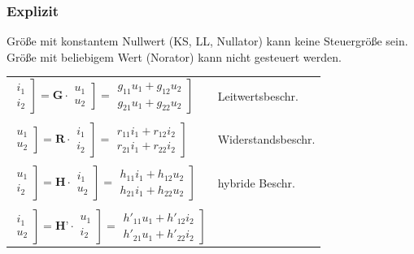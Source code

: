 \documentclass[a4paper,twocolumn,10pt]{article}
\begin{document}
\subsubsection*{Explizit}
Größe mit konstantem Nullwert (KS, LL, Nullator) kann keine Steuergröße sein. Größe mit beliebigem Wert (Norator) kann nicht gesteuert werden.
\begin{tabular}{ll}
	$\left.\begin{matrix}i_1\\i_2\end{matrix}\right] =\textbf{G}\cdot \left.\begin{matrix}u_1\\u_2\end{matrix}\right]=\left.\begin{matrix}g_{11}u_1+g_{12}u_2\\g_{21}u_1+g_{22}u_2\end{matrix}\right]$ &
	Leitwertsbeschr.\\\\
	$\left.\begin{matrix}u_1\\u_2\end{matrix}\right] =\textbf{R}\cdot \left.\begin{matrix}i_1\\i_2\end{matrix}\right]=\left.\begin{matrix}r_{11}i_1+r_{12}i_2\\r_{21}i_1+r_{22}i_2\end{matrix}\right]$ &
	Widerstandsbeschr.\\\\
	$\left.\begin{matrix}u_1\\i_2\end{matrix}\right] =\textbf{H}\cdot \left.\begin{matrix}i_1\\u_2\end{matrix}\right]=\left.\begin{matrix}h_{11}i_1+h_{12}u_2\\h_{21}i_1+h_{22}u_2\end{matrix}\right]$ &
	hybride Beschr.\\\\
	$\left.\begin{matrix}i_1\\u_2\end{matrix}\right] =\textbf{H'}\cdot \left.\begin{matrix}u_1\\i_2\end{matrix}\right]=\left.\begin{matrix}h'_{11}u_1+h'_{12}i_2\\h'_{21}u_1+h'_{22}i_2\end{matrix}\right]$ &

\end{tabular}
\end{document}
